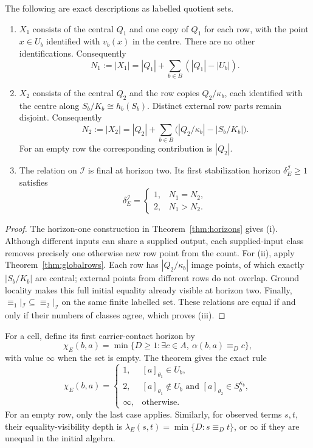 \begin{theorem}\label{thm:interface}
The following are exact descriptions as labelled quotient sets.
\begin{enumerate}[label=(\roman*)]
\item $X_1$ consists of the central $Q_1$ and one copy of $Q_1$ for each
row, with the point $x\in U_b$ identified with $v_b(x)$ in the centre.
There are no other identifications. Consequently
\begin{equation}\label{eq:N1}
N_1:=|X_1|=|Q_1|+\sum_{b\in B}(|Q_1|-|U_b|).
\end{equation}
\item $X_2$ consists of the central $Q_2$ and the row copies
$Q_2/\kappa_b$, each identified with the centre along
$S_b/K_b\cong h_b(S_b)$. Distinct external row parts remain disjoint.
Consequently
\begin{equation}\label{eq:N2}
N_2:=|X_2|=|Q_2|+
\sum_{b\in B}\bigl(|Q_2/\kappa_b|-|S_b/K_b|\bigr).
\end{equation}
For an empty row the corresponding contribution is $|Q_2|$.
\item The relation on $\mathcal I$ is final at horizon two. Its first
stabilization horizon $\delta_E^{\mathcal I}\ge1$ satisfies
\[
\delta_E^{\mathcal I}=
\begin{cases}
1,&N_1=N_2,\\
2,&N_1>N_2.
\end{cases}
\]
\end{enumerate}
\end{theorem}

\begin{proof}
The horizon-one construction in Theorem~\ref{thm:horizons} gives (i).
Although different inputs can share a supplied output, each supplied-input
class removes precisely one otherwise new row point from the count.
For (ii), apply Theorem~\ref{thm:globalrows}. Each row has
$|Q_2/\kappa_b|$ image points, of which exactly $|S_b/K_b|$ are central;
external points from different rows do not overlap. Ground locality makes
this full initial equality already visible at horizon two. Finally,
$\equiv_1|_{\mathcal I}\subseteq\equiv_2|_{\mathcal I}$ on the same finite
labelled set. These relations are equal if and only if their numbers of
classes agree, which proves (iii).
\end{proof}

For a cell, define its first carrier-contact horizon by
\[
\chi_E(b,a)=\min\{D\ge1:\exists c\in A,\ 
\alpha(b,a)\equiv_D c\},
\]
with value $\infty$ when the set is empty. The theorem gives the exact rule
\[
\chi_E(b,a)=
\begin{cases}
1,&[a]_{\theta_1}\in U_b,\\
2,&[a]_{\theta_1}\notin U_b\text{ and }[a]_{\theta_2}\in S_b^{\kappa_b},\\
\infty,&\text{otherwise}.
\end{cases}
\]
For an empty row, only the last case applies. Similarly, for observed terms
$s,t$, their equality-visibility depth is
$\lambda_E(s,t)=\min\{D:s\equiv_D t\}$, or $\infty$ if they are unequal
in the initial algebra.

